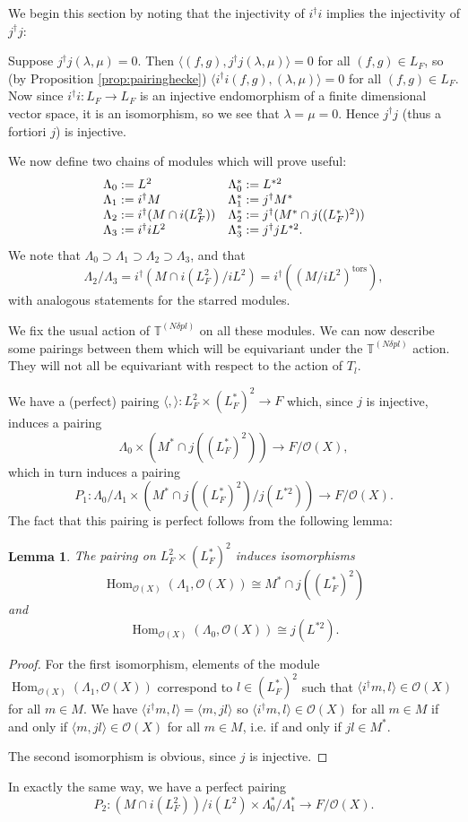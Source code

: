 \documentclass[a4paper, notitlepage]{amsart}
\newcommand{\OO}{\ensuremath{\mathscr{O}}\xspace}
\DeclareMathOperator{\Hom}{Hom}
\newtheorem{lemma}[theorem]{Lemma}
\begin{document}
We begin this section by noting that the injectivity of $i^\dagger i$ implies the injectivity of $j^\dagger j$:

Suppose $j^\dagger j (\lambda,\mu)=0$. Then $\langle (f,g),j^\dagger j (\lambda,\mu)\rangle=0$ for all $(f,g)\in L_F$, so (by Proposition \ref{prop:pairinghecke}) $\langle i^\dagger i(f,g),(\lambda,\mu)\rangle =0$ for all $(f,g)\in L_F$. Now since $i^\dagger i:L_F\rightarrow L_F$ is an injective endomorphism of a finite dimensional vector space, it is an isomorphism, so we see that $\lambda=\mu=0$. Hence $j^\dagger j$ (thus a fortiori $j$) is injective.

We now define two chains of modules which will prove useful:
$$\begin{array}{l l}\Lambda_0:=L^2 & \Lambda_0^*:=L^{*2}\\
\Lambda_1:=i^\dagger M & \Lambda_1^*:=j^\dagger M^*\\
\Lambda_2:=i^\dagger(M\cap i(L_F^2)) & \Lambda_2^*:=j^\dagger(M^*\cap j((L^*_F)^2))\\
\Lambda_3:=i^\dagger i L^2 & \Lambda_3^*:=j^\dagger j L^{*2}.\end{array}$$
We note that $\Lambda_0\supset \Lambda_1 \supset \Lambda_2 \supset \Lambda_3$, and that $$\Lambda_2/\Lambda_3=i^\dagger(M\cap i(L_F^2)/iL^2)=i^\dagger((M/iL^2)^{\mathrm{tors}}),$$ with analogous statements for the starred modules.

We fix the usual action of $\mathbb{T}^{(N\delta p l)}$ on all these modules. We can now describe some pairings between them which will be equivariant under the $\mathbb{T}^{(N\delta p l)}$ action. They will not all be equivariant with respect to the action of $T_l$.

We have a (perfect) pairing $\langle,\rangle:L_F^2\times (L^*_F)^2\rightarrow F$ which, since $j$ is injective, induces a pairing $$\Lambda_0 \times (M^*\cap j((L^*_F)^2)) \rightarrow F/\OO(X),$$ which in turn induces a pairing $$P_1: \Lambda_0/\Lambda_1 \times (M^*\cap j((L^*_F)^2)/j(L^{*2})) \rightarrow F/\OO(X).$$ The fact that this pairing is perfect follows from the following lemma:

\begin{lemma}
The pairing on $L_F^2\times (L^*_F)^2$ induces isomorphisms $$\Hom_{\OO(X)}(\Lambda_1,\OO(X))\cong M^*\cap j((L^*_F)^2)$$ and $$\Hom_{\OO(X)}(\Lambda_0,\OO(X))\cong j(L^{*2}).$$\end{lemma}
\begin{proof}
For the first isomorphism, elements of the module $\Hom_{\OO(X)}(\Lambda_1,\OO(X))$ correspond to $l \in (L^*_F)^2$ such that $\langle i^\dagger m,l\rangle \in \OO(X)$ for all $m \in M$. We have $\langle i^\dagger m,l\rangle =\langle m, jl \rangle$ so $\langle i^\dagger m,l\rangle \in \OO(X)$ for all $m \in M$ if and only if $\langle m, jl \rangle \in \OO(X)$ for all $m \in M$, i.e. if and only if $jl \in M^*$. 

The second isomorphism is obvious, since $j$ is injective.
\end{proof}
In exactly the same way, we have a perfect pairing 
$$P_2: (M\cap i(L_F^2))/i(L^2) \times \Lambda_0^*/\Lambda_1^* \rightarrow F/\OO(X).$$
\end{document}
